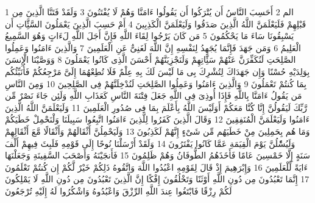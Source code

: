 \documentclass[20pt,a4paper]{article}
\title{}
\author{}
\date{}
\begin{document}
\pagecolor{cl_page}



{\tiny\colorbox{cl_aya}{1}} الم
{\tiny\colorbox{cl_aya}{2}} أَحَسِبَ النَّاسُ أَن يُتْرَكُوا أَن يَقُولُوا ءَامَنَّا وَهُمْ لَا يُفْتَنُونَ
{\tiny\colorbox{cl_aya}{3}} وَلَقَدْ فَتَنَّا الَّذِينَ مِن قَبْلِهِمْ فَلَيَعْلَمَنَّ اللَّهُ الَّذِينَ صَدَقُوا وَلَيَعْلَمَنَّ الْكَذِبِينَ
{\tiny\colorbox{cl_aya}{4}} أَمْ حَسِبَ الَّذِينَ يَعْمَلُونَ السَّئَِّاتِ أَن يَسْبِقُونَا سَاءَ مَا يَحْكُمُونَ
{\tiny\colorbox{cl_aya}{5}} مَن كَانَ يَرْجُوا لِقَاءَ اللَّهِ فَإِنَّ أَجَلَ اللَّهِ لَءَاتٍ وَهُوَ السَّمِيعُ الْعَلِيمُ
{\tiny\colorbox{cl_aya}{6}} وَمَن جَهَدَ فَإِنَّمَا يُجَهِدُ لِنَفْسِهِ إِنَّ اللَّهَ لَغَنِىٌّ عَنِ الْعَلَمِينَ
{\tiny\colorbox{cl_aya}{7}} وَالَّذِينَ ءَامَنُوا وَعَمِلُوا الصَّلِحَتِ لَنُكَفِّرَنَّ عَنْهُمْ سَئَِّاتِهِمْ وَلَنَجْزِيَنَّهُمْ أَحْسَنَ الَّذِى كَانُوا يَعْمَلُونَ
{\tiny\colorbox{cl_aya}{8}} وَوَصَّيْنَا الْإِنسَنَ بِوَلِدَيْهِ حُسْنًا وَإِن جَهَدَاكَ لِتُشْرِكَ بِى مَا لَيْسَ لَكَ بِهِ عِلْمٌ فَلَا تُطِعْهُمَا إِلَىَّ مَرْجِعُكُمْ فَأُنَبِّئُكُم بِمَا كُنتُمْ تَعْمَلُونَ
{\tiny\colorbox{cl_aya}{9}} وَالَّذِينَ ءَامَنُوا وَعَمِلُوا الصَّلِحَتِ لَنُدْخِلَنَّهُمْ فِى الصَّلِحِينَ
{\tiny\colorbox{cl_aya}{10}} وَمِنَ النَّاسِ مَن يَقُولُ ءَامَنَّا بِاللَّهِ فَإِذَا أُوذِىَ فِى اللَّهِ جَعَلَ فِتْنَةَ النَّاسِ كَعَذَابِ اللَّهِ وَلَئِن جَاءَ نَصْرٌ مِّن رَّبِّكَ لَيَقُولُنَّ إِنَّا كُنَّا مَعَكُمْ أَوَلَيْسَ اللَّهُ بِأَعْلَمَ بِمَا فِى صُدُورِ الْعَلَمِينَ
{\tiny\colorbox{cl_aya}{11}} وَلَيَعْلَمَنَّ اللَّهُ الَّذِينَ ءَامَنُوا وَلَيَعْلَمَنَّ الْمُنَفِقِينَ
{\tiny\colorbox{cl_aya}{12}} وَقَالَ الَّذِينَ كَفَرُوا لِلَّذِينَ ءَامَنُوا اتَّبِعُوا سَبِيلَنَا وَلْنَحْمِلْ خَطَيَكُمْ وَمَا هُم بِحَمِلِينَ مِنْ خَطَيَهُم مِّن شَىْءٍ إِنَّهُمْ لَكَذِبُونَ
{\tiny\colorbox{cl_aya}{13}} وَلَيَحْمِلُنَّ أَثْقَالَهُمْ وَأَثْقَالًا مَّعَ أَثْقَالِهِمْ وَلَيُسَْٔلُنَّ يَوْمَ الْقِيَمَةِ عَمَّا كَانُوا يَفْتَرُونَ
{\tiny\colorbox{cl_aya}{14}} وَلَقَدْ أَرْسَلْنَا نُوحًا إِلَى قَوْمِهِ فَلَبِثَ فِيهِمْ أَلْفَ سَنَةٍ إِلَّا خَمْسِينَ عَامًا فَأَخَذَهُمُ الطُّوفَانُ وَهُمْ ظَلِمُونَ
{\tiny\colorbox{cl_aya}{15}} فَأَنجَيْنَهُ وَأَصْحَبَ السَّفِينَةِ وَجَعَلْنَهَا ءَايَةً لِّلْعَلَمِينَ
{\tiny\colorbox{cl_aya}{16}} وَإِبْرَهِيمَ إِذْ قَالَ لِقَوْمِهِ اعْبُدُوا اللَّهَ وَاتَّقُوهُ ذَلِكُمْ خَيْرٌ لَّكُمْ إِن كُنتُمْ تَعْلَمُونَ
{\tiny\colorbox{cl_aya}{17}} إِنَّمَا تَعْبُدُونَ مِن دُونِ اللَّهِ أَوْثَنًا وَتَخْلُقُونَ إِفْكًا إِنَّ الَّذِينَ تَعْبُدُونَ مِن دُونِ اللَّهِ لَا يَمْلِكُونَ لَكُمْ رِزْقًا فَابْتَغُوا عِندَ اللَّهِ الرِّزْقَ وَاعْبُدُوهُ وَاشْكُرُوا لَهُ إِلَيْهِ تُرْجَعُونَ
\end{document}
